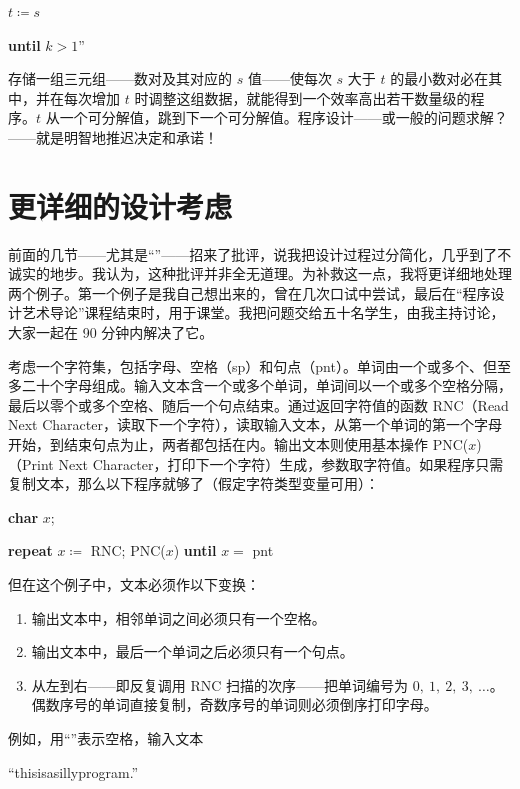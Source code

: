 \quad \quad $t \coloneq s$

\quad \textbf{until} $k > 1$''

存储一组三元组——数对及其对应的 $s$ 值——使每次 $s$ 大于 $t$ 的最小数对必在其中，并在每次增加 $t$ 时调整这组数据，就能得到一个效率高出若干数量级的程序。$t$ 从一个可分解值，跳到下一个可分解值。程序设计——或一般的问题求解？——就是明智地推迟决定和承诺！

\section[更详细的设计考虑]{更详细的设计考虑}

前面的几节——尤其是“”——招来了批评，说我把设计过程过分简化，几乎到了不诚实的地步。我认为，这种批评并非全无道理。为补救这一点，我将更详细地处理两个例子。第一个例子是我自己想出来的，曾在几次口试中尝试，最后在“程序设计艺术导论”课程结束时，用于课堂。我把问题交给五十名学生，由我主持讨论，大家一起在 90 分钟内解决了它。

考虑一个字符集，包括字母、空格（sp）和句点（pnt）。单词由一个或多个、但至多二十个字母组成。输入文本含一个或多个单词，单词间以一个或多个空格分隔，最后以零个或多个空格、随后一个句点结束。通过返回字符值的函数 RNC（Read Next Character，读取下一个字符），读取输入文本，从第一个单词的第一个字母开始，到结束句点为止，两者都包括在内。输出文本则使用基本操作 PNC($x$)（Print Next Character，打印下一个字符）生成，参数取字符值。如果程序只需复制文本，那么以下程序就够了（假定字符类型变量可用）：

\quad \textbf{char} $x$;

\quad \textbf{repeat} $x \coloneq$ RNC; PNC($x$) \textbf{until} $x =$ pnt

但在这个例子中，文本必须作以下变换：

\begin{enumerate}[wide, nosep, label=(\arabic*)]
	\item 输出文本中，相邻单词之间必须只有一个空格。
	\item 输出文本中，最后一个单词之后必须只有一个句点。
	\item 从左到右——即反复调用 RNC 扫描的次序——把单词编号为 $0,\ 1,\ 2,\ 3,\ \dots$。偶数序号的单词直接复制，奇数序号的单词则必须倒序打印字母。
\end{enumerate}

例如，用“\textendash”表示空格，输入文本

\quad ``this\textemdash{}is\textemdash{}a\textemdash{}silly\textemdash{}program\textemdash{}.''

